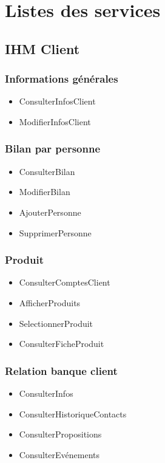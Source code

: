 \section{Listes des services}
\subsection{IHM Client}
\subsubsection*{Informations générales}
\begin{itemize}
\item ConsulterInfosClient
\item ModifierInfosClient
\end{itemize}
\subsubsection*{Bilan par personne}
\begin{itemize}
\item ConsulterBilan 
\item ModifierBilan 
\item AjouterPersonne 
\item SupprimerPersonne
\end{itemize}
\subsubsection*{Produit}
\begin{itemize}
\item ConsulterComptesClient 
\item AfficherProduits 
\item SelectionnerProduit 
\item ConsulterFicheProduit
\end{itemize}

\subsubsection*{Relation banque client}
\begin{itemize}
\item ConsulterInfos
\item ConsulterHistoriqueContacts  
\item ConsulterPropositions 
\item ConsulterEvénements 

\end{itemize}
